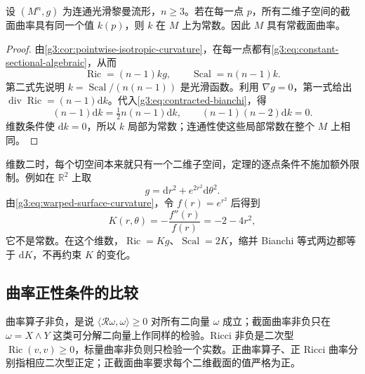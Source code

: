 \begin{theorem}[Schur]
	\label{g3:thm:schur}
	设 \((M^n,g)\) 为连通光滑黎曼流形，\(n\geq3\)。若在每一点 \(p\)，所有二维子空间的截面曲率具有同一个值 \(k(p)\)，则 \(k\) 在 \(M\) 上为常数。因此 \(M\) 具有常截面曲率。
\end{theorem}
\begin{proof}
	由\cref{g3:cor:pointwise-isotropic-curvature}，在每一点都有\eqref{g3:eq:constant-sectional-algebraic}，从而
	\[
		\operatorname{Ric}=(n-1)kg,\qquad
		\operatorname{Scal}=n(n-1)k.
	\]
	第二式先说明 \(k=\operatorname{Scal}/(n(n-1))\) 是光滑函数。利用 \(\nabla g=0\)，第一式给出 \(\operatorname{div}\operatorname{Ric}=(n-1)\mathrm{d}k\)。代入\eqref{g3:eq:contracted-bianchi}，得
	\[
		(n-1)\mathrm{d}k=\tfrac12n(n-1)\mathrm{d}k,
		\qquad (n-1)(n-2)\mathrm{d}k=0.
	\]
	维数条件使 \(\mathrm{d}k=0\)，所以 \(k\) 局部为常数；连通性使这些局部常数在整个 \(M\) 上相同。
\end{proof}

维数二时，每个切空间本来就只有一个二维子空间，定理的逐点条件不施加额外限制。例如在 \(\mathbb R^2\) 上取
\[
	g=\mathrm{d}r^2+e^{2r^2}\mathrm{d}\theta^2.
\]
由\eqref{g3:eq:warped-surface-curvature}，令 \(f(r)=e^{r^2}\) 后得到
\[
	K(r,\theta)=-\frac{f''(r)}{f(r)}=-2-4r^2,
\]
它不是常数。在这个维数，\(\operatorname{Ric}=Kg\)、\(\operatorname{Scal}=2K\)，缩并 Bianchi 等式两边都等于 \(\mathrm{d}K\)，不再约束 \(K\) 的变化。

\subsection{曲率正性条件的比较}
\label{g3:subsec:0302:04}

曲率算子非负，是说 \(\langle\mathcal R\omega,\omega\rangle\geq0\) 对所有二向量 \(\omega\) 成立；截面曲率非负只在 \(\omega=X\wedge Y\) 这类可分解二向量上作同样的检验。Ricci 非负是二次型 \(\operatorname{Ric}(v,v)\geq0\)，标量曲率非负则只检验一个实数。正曲率算子、正 Ricci 曲率分别指相应二次型正定；正截面曲率要求每个二维截面的值严格为正。

